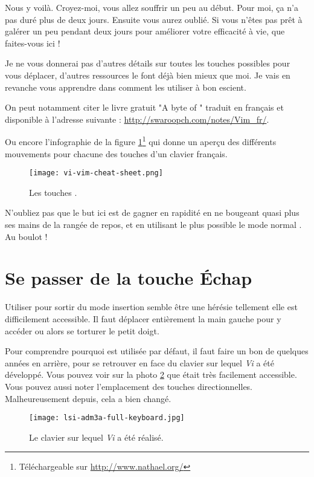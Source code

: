 Nous y voilà. Croyez-moi, vous allez souffrir un peu au début. Pour moi, ça n'a pas duré plus de deux jours. Ensuite vous aurez oublié. Si vous n'êtes pas prêt à galérer un peu pendant deux jours pour améliorer votre efficacité à vie, que faites-vous ici !

Je ne vous donnerai pas d'autres détails sur toutes les touches possibles pour vous déplacer, d'autres ressources le font déjà bien mieux que moi. Je vais en revanche vous apprendre dans  comment les utiliser à bon escient.

On peut notamment citer le livre gratuit "A byte of \vim" traduit en français et disponible à l'adresse suivante : \url{http://swaroopch.com/notes/Vim_fr/}.

Ou encore l'infographie de la figure \ref{fig:vim-cheat-sheet}\footnote{Téléchargeable sur \url{http://www.nathael.org/}} qui donne un aperçu des différents mouvements pour chacune des touches d'un clavier français.

\begin{figure}%
  \texttt{[image: vi-vim-cheat-sheet.png]}
  \caption{Les touches \vim.}
  \label{fig:vim-cheat-sheet}
\end{figure}

N'oubliez pas que le but ici est de gagner en rapidité en ne bougeant quasi plus ses mains de la rangée de repos, et en utilisant le plus possible le \og mode normal \fg. Au boulot !

\section{Se passer de la touche Échap}\label{sec:esc}

Utiliser \ttesc pour sortir du mode \og insertion \fg{} semble être une hérésie tellement elle est difficilement accessible. Il faut déplacer entièrement la main gauche pour y accéder ou alors se torturer le petit doigt.

Pour comprendre pourquoi \ttesc est utilisée par défaut, il faut faire un bon de quelques années en arrière, pour se retrouver en face du clavier sur lequel \emph{Vi} a été développé. Vous pouvez voir sur la photo \ref{fig:vim-keyboard} que \ttesc était très facilement accessible. Vous pouvez aussi noter l'emplacement des touches directionnelles. Malheureusement depuis, cela a bien changé.

\begin{figure}%
  \texttt{[image: lsi-adm3a-full-keyboard.jpg]}
  \caption{Le clavier sur lequel \emph{Vi} a été réalisé.}
  \label{fig:vim-keyboard}
\end{figure}

